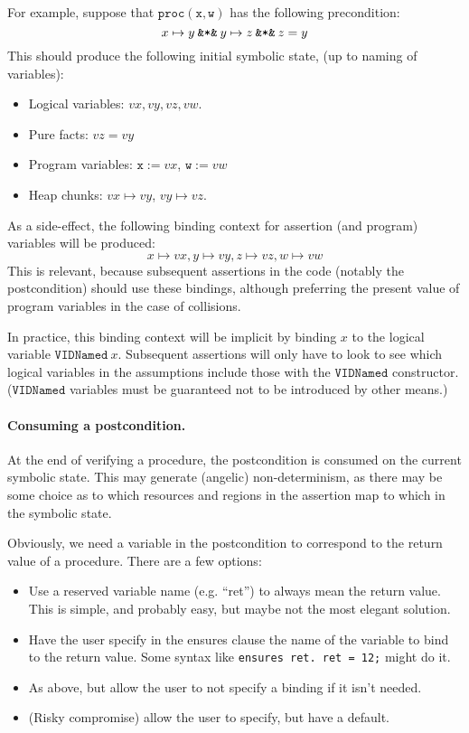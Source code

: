 \documentclass[a4paper]{article}
\begin{document}
For example, suppose that $\mathtt{proc(x, w)}$ has the following precondition:
\[
  x \mapsto y \mathbin{\verb|&*&|} y \mapsto z \mathbin{\verb|&*&|} z = y
\]
This should produce the following initial symbolic state, (up to naming of variables):
\begin{itemize}
  \item Logical variables: $\mathit{vx}, \mathit{vy}, \mathit{vz}, \mathit{vw}$.
  \item Pure facts: $\mathit{vz} = \mathit{vy}$
  \item Program variables: $\mathtt{x} := \mathit{vx}$, $\mathtt{w} := \mathit{vw}$
  \item Heap chunks: $\mathit{vx} \mapsto \mathit{vy}$, $\mathit{vy} \mapsto \mathit{vz}$.
\end{itemize}
As a side-effect, the following binding context for assertion (and program) variables will be produced:
\[
  x \mapsto \mathit{vx}, y \mapsto \mathit{vy}, z \mapsto \mathit{vz}, w \mapsto \mathit{vw}
\]
This is relevant, because subsequent assertions in the code (notably the postcondition) should use these bindings, although preferring the present value of program variables in the case of collisions.

In practice, this binding context will be implicit by  binding $x$ to the logical variable $\mathtt{VIDNamed}\ x$.
Subsequent assertions will only have to look to see which logical variables in the assumptions include those with the $\mathtt{VIDNamed}$ constructor.
($\mathtt{VIDNamed}$ variables must be guaranteed not to be introduced by other means.)

\paragraph{Consuming a postcondition.}
At the end of verifying a procedure, the postcondition is consumed on the current symbolic state.
This may generate (angelic) non-determinism, as there may be some choice as to which resources and regions in the assertion map to which in the symbolic state.

Obviously, we need a variable in the postcondition to correspond to the return value of a procedure.
There are a few options:
\begin{itemize}
  \item Use a reserved variable name (e.g. ``ret'') to always mean the return value.
    This is simple, and probably easy, but maybe not the most elegant solution.
  \item Have the user specify in the ensures clause the name of the variable to bind to the return value.
    Some syntax like \texttt{ensures ret. ret = 12;} might do it.
  \item As above, but allow the user to not specify a binding if it isn't needed.
  \item (Risky compromise) allow the user to specify, but have a default.
\end{itemize}
\end{document}
